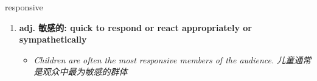 
\begin{frame}
{\huge responsive}
\begin{center}
\begin{enumerate}\Large
  \item \textbf{adj. 敏感的: quick to respond or react appropriately or sympathetically}
  \begin{itemize}
    \item \em{\Large{Children are often the most responsive members of the audience. 儿童通常是观众中最为敏感的群体}}
  \end{itemize}
\end{enumerate}
\end{center}
\end{frame}
